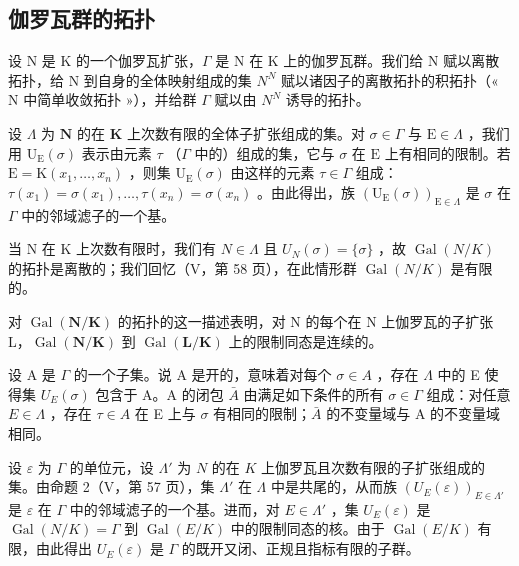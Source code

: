 \subsection{伽罗瓦群的拓扑}

设 N 是 K 的一个伽罗瓦扩张，\(\Gamma\) 是 N 在 K 上的伽罗瓦群。我们给 N 赋以离散拓扑，给 N 到自身的全体映射组成的集 \(N^{N}\) 赋以诸因子的离散拓扑的积拓扑（« N 中简单收敛拓扑 »），并给群 \(\Gamma\) 赋以由 \(N^{N}\) 诱导的拓扑。

设 \(\Lambda\) 为 \(\mathbf{N}\) 的在 \(\mathbf{K}\) 上次数有限的全体子扩张组成的集。对 \(\sigma \in \Gamma\) 与 \(\mathrm{E} \in \Lambda\) ，我们用 \(\mathrm{U}_{\mathrm{E}}(\sigma)\) 表示由元素 \(\tau\) （\(\Gamma\) 中的）组成的集，它与 \(\sigma\) 在 \(\mathrm{E}\) 上有相同的限制。若 \(\mathrm{E} = \mathrm{K}(x_1, \ldots, x_n)\) ，则集 \(\mathrm{U}_{\mathrm{E}}(\sigma)\) 由这样的元素 \(\tau \in \Gamma\) 组成：\(\tau(x_1) = \sigma(x_1), \ldots, \tau(x_n) = \sigma(x_n)\) 。由此得出，族 \((\mathrm{U}_{\mathrm{E}}(\sigma))_{\mathrm{E} \in \Lambda}\) 是 \(\sigma\) 在 \(\Gamma\) 中的邻域滤子的一个基。

当 N 在 K 上次数有限时，我们有 \(N \in \Lambda\) 且 \(U_{N}(\sigma) = \{\sigma\}\) ，故 \(\operatorname{Gal}(N/K)\) 的拓扑是离散的；我们回忆（V，第 58 页），在此情形群 \(\operatorname{Gal}(N/K)\) 是有限的。

对 \(\operatorname{Gal}(\mathbf{N}/\mathbf{K})\) 的拓扑的这一描述表明，对 N 的每个在 N 上伽罗瓦的子扩张 L，\(\operatorname{Gal}(\mathbf{N}/\mathbf{K})\) 到 \(\operatorname{Gal}(\mathbf{L}/\mathbf{K})\) 上的限制同态是连续的。

设 A 是 \(\Gamma\) 的一个子集。说 A 是开的，意味着对每个 \(\sigma\in A\) ，存在 \(\Lambda\) 中的 E 使得集 \(U_{E}(\sigma)\) 包含于 A。A 的闭包 \(\bar{A}\) 由满足如下条件的所有 \(\sigma\in\Gamma\) 组成：对任意 \(E\in\Lambda\) ，存在 \(\tau\in A\) 在 E 上与 \(\sigma\) 有相同的限制；\(\bar{A}\) 的不变量域与 A 的不变量域相同。

设 \(\varepsilon\) 为 \(\Gamma\) 的单位元，设 \(\Lambda'\) 为 \(N\) 的在 \(K\) 上伽罗瓦且次数有限的子扩张组成的集。由命题 2（V，第 57 页），集 \(\Lambda'\) 在 \(\Lambda\) 中是共尾的，从而族 \((U_E(\varepsilon))_{E \in \Lambda'}\) 是 \(\varepsilon\) 在 \(\Gamma\) 中的邻域滤子的一个基。进而，对 \(E \in \Lambda'\) ，集 \(U_E(\varepsilon)\) 是 \(\operatorname{Gal}(N/K) = \Gamma\) 到 \(\operatorname{Gal}(E/K)\) 中的限制同态的核。由于 \(\operatorname{Gal}(E/K)\) 有限，由此得出 \(U_E(\varepsilon)\) 是 \(\Gamma\) 的既开又闭、正规且指标有限的子群。

